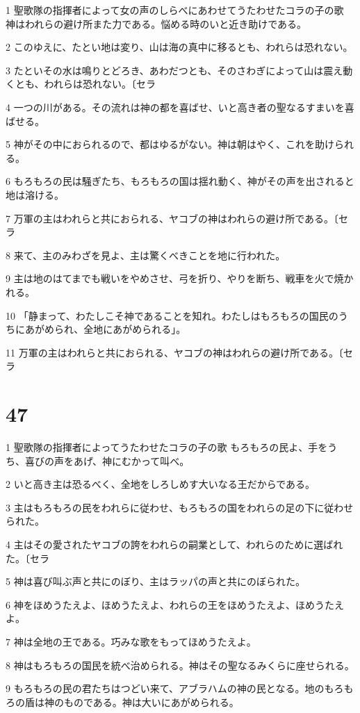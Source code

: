 \par 1 聖歌隊の指揮者によって女の声のしらべにあわせてうたわせたコラの子の歌 神はわれらの避け所また力である。悩める時のいと近き助けである。
\par 2 このゆえに、たとい地は変り、山は海の真中に移るとも、われらは恐れない。
\par 3 たといその水は鳴りとどろき、あわだつとも、そのさわぎによって山は震え動くとも、われらは恐れない。〔セラ
\par 4 一つの川がある。その流れは神の都を喜ばせ、いと高き者の聖なるすまいを喜ばせる。
\par 5 神がその中におられるので、都はゆるがない。神は朝はやく、これを助けられる。
\par 6 もろもろの民は騒ぎたち、もろもろの国は揺れ動く、神がその声を出されると地は溶ける。
\par 7 万軍の主はわれらと共におられる、ヤコブの神はわれらの避け所である。〔セラ
\par 8 来て、主のみわざを見よ、主は驚くべきことを地に行われた。
\par 9 主は地のはてまでも戦いをやめさせ、弓を折り、やりを断ち、戦車を火で焼かれる。
\par 10 「静まって、わたしこそ神であることを知れ。わたしはもろもろの国民のうちにあがめられ、全地にあがめられる」。
\par 11 万軍の主はわれらと共におられる、ヤコブの神はわれらの避け所である。〔セラ

\chapter{47}

\par 1 聖歌隊の指揮者によってうたわせたコラの子の歌 もろもろの民よ、手をうち、喜びの声をあげ、神にむかって叫べ。
\par 2 いと高き主は恐るべく、全地をしろしめす大いなる王だからである。
\par 3 主はもろもろの民をわれらに従わせ、もろもろの国をわれらの足の下に従わせられた。
\par 4 主はその愛されたヤコブの誇をわれらの嗣業として、われらのために選ばれた。〔セラ
\par 5 神は喜び叫ぶ声と共にのぼり、主はラッパの声と共にのぼられた。
\par 6 神をほめうたえよ、ほめうたえよ、われらの王をほめうたえよ、ほめうたえよ。
\par 7 神は全地の王である。巧みな歌をもってほめうたえよ。
\par 8 神はもろもろの国民を統べ治められる。神はその聖なるみくらに座せられる。
\par 9 もろもろの民の君たちはつどい来て、アブラハムの神の民となる。地のもろもろの盾は神のものである。神は大いにあがめられる。

